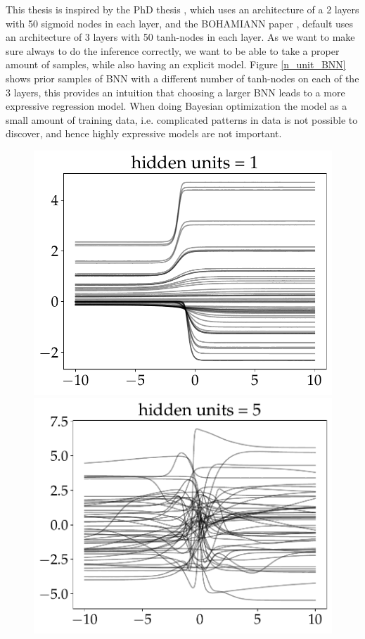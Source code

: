 This thesis is inspired by the PhD thesis \cite{PhDthesis}, which uses an architecture of a 2 layers
with 50 sigmoid nodes in each layer, and the BOHAMIANN paper \cite{BOHAMIANN}, default uses an architecture
of 3 layers with 50 tanh-nodes in each layer. As we want to make sure always to do the 
inference correctly, we want to be able to take a proper amount of samples, while also
having an explicit model. Figure \eqref{n_unit_BNN} shows prior samples of BNN with a different
number of tanh-nodes on each of the 3 layers, this provides an intuition that choosing a larger
BNN leads to a more expressive regression model. When doing Bayesian optimization the model as a small
amount of training data, i.e. complicated patterns in data is not possible to discover, and hence 
highly expressive models are not important. 

\begin{figure}[H]
    \centering
    \begin{minipage}[b]{0.24\textwidth}
     \includegraphics[width=\textwidth]{Pictures/bayesian_nn_prior_samples_hidden_units_0.pdf}
    \end{minipage}
    \hfill
    \begin{minipage}[b]{0.24\textwidth}
     \includegraphics[width=\textwidth]{Pictures/bayesian_nn_prior_samples_hidden_units_1.pdf}

\end{minipage}
\end{figure}
